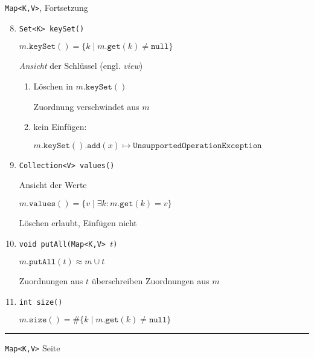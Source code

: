 \documentclass{slides}
\newcounter{mypage}
\begin{document}
\begin{slide}{}
\normalsize

\begin{center}
\texttt{Map<K,V>}, Fortsetzung
\end{center}
\vspace*{0.5cm}

\footnotesize
\begin{enumerate}
\setcounter{enumi}{7}
 \item \texttt{Set<K> keySet()}

      $m.\mathtt{keySet}() = \{ k \mid m.\mathtt{get}(k) \not= \mathtt{null} \}$
      \vspace*{0.3cm}

      \emph{Ansicht} der Schl\"ussel (engl. \emph{view})
      \begin{enumerate}
      \item L\"oschen in $m.\mathtt{keySet}()$

            Zuordnung verschwindet aus $m$
      \item kein Einf\"ugen: 

            $m.\mathtt{keySet}().\mathtt{add}(x) \mapsto \texttt{UnsupportedOperationException}$
      \end{enumerate}

\item \texttt{Collection<V> values()}

      Ansicht der Werte

      $m.\mathtt{values}() = \{ v \mid \exists k: m.\mathtt{get}(k) = v \}$

      L\"oschen erlaubt, Einf\"ugen nicht
\item \texttt{void putAll(Map<K,V> $t$)}

      $m.\mathtt{putAll}(t) \approx m \cup t$ 

      Zuordnungen aus $t$ \"uberschreiben Zuordnungen aus $m$
\item \texttt{int size()}

      $m.\mathtt{size}() = \#\{ k \mid m.\mathtt{get}(k) \not= \mathtt{null} \}$
\end{enumerate}

\vspace*{\fill}
\tiny \addtocounter{mypage}{1}
\rule{17cm}{1mm}
\texttt{Map<K,V>} \hspace*{\fill} Seite 
\end{slide}

\end{document}
